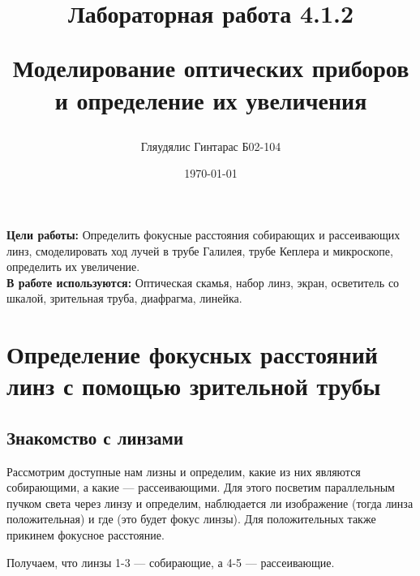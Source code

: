 \documentclass[a4paper,12pt]{article}
\author{Гляудялис Гинтарас Б02-104}
\title{Лабораторная работа 4.1.2

Моделирование оптических приборов и определение их увеличения}
\date{\today}
\begin{document}
\maketitle

\begin{flushleft}
    \hspace*{2.5 mm}
    \textbf{Цели работы:}
    Определить фокусные расстояния собирающих и рассеивающих линз, 
    смоделировать ход лучей в трубе Галилея, трубе Кеплера и микроскопе, 
    определить их увеличение.\\
    \hspace*{2.5 mm}
    \textbf{В работе используются:}
    Оптическая скамья, набор линз, экран, осветитель со шкалой, 
    зрительная труба, диафрагма, линейка.
\end{flushleft}

\section*{Определение фокусных расстояний линз с помощью зрительной трубы}
\subsection*{Знакомство с линзами}
Рассмотрим доступные нам лизны и определим, какие из них являются собирающими, а какие --- рассеивающими. Для этого посветим параллельным пучком света через линзу и определим, наблюдается ли изображение (тогда линза положительная) и где (это будет фокус линзы). Для положительных также прикинем фокусное расстояние.
\par Получаем, что линзы 1-3 --- собирающие, а 4-5 --- рассеивающие. \par
\end{document}
